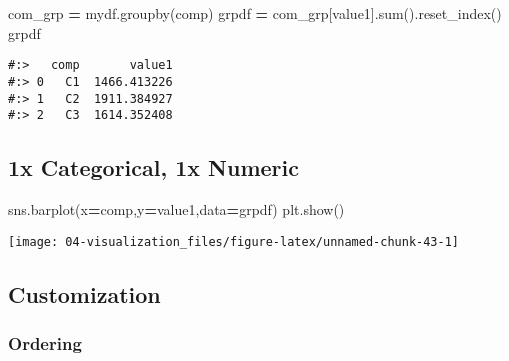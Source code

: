 \documentclass[
]{book}
\newenvironment{Shaded}{\begin{snugshade}}{\end{snugshade}}
\newcommand{\BuiltInTok}[1]{#1}
\newcommand{\NormalTok}[1]{#1}
\newcommand{\OperatorTok}[1]{\textcolor[rgb]{0.43,0.43,0.43}{\textbf{#1}}}
\newcommand{\StringTok}[1]{\textcolor[rgb]{0.5,0.5,0.5}{#1}}
\begin{document}
\begin{Shaded}
\begin{Highlighting}[]
\NormalTok{com\_grp }\OperatorTok{=}\NormalTok{ mydf.groupby(}\StringTok{\textquotesingle{}comp\textquotesingle{}}\NormalTok{)}
\NormalTok{grpdf }\OperatorTok{=}\NormalTok{ com\_grp[}\StringTok{\textquotesingle{}value1\textquotesingle{}}\NormalTok{].}\BuiltInTok{sum}\NormalTok{().reset\_index()}
\NormalTok{grpdf}
\end{Highlighting}
\end{Shaded}

\begin{verbatim}
#:>   comp       value1
#:> 0   C1  1466.413226
#:> 1   C2  1911.384927
#:> 2   C3  1614.352408
\end{verbatim}

\hypertarget{x-categorical-1x-numeric}{%
\subsection{1x Categorical, 1x Numeric}\label{x-categorical-1x-numeric}}

\begin{Shaded}
\begin{Highlighting}[]
\NormalTok{sns.barplot(x}\OperatorTok{=}\StringTok{\textquotesingle{}comp\textquotesingle{}}\NormalTok{,y}\OperatorTok{=}\StringTok{\textquotesingle{}value1\textquotesingle{}}\NormalTok{,data}\OperatorTok{=}\NormalTok{grpdf)}
\NormalTok{plt.show()}
\end{Highlighting}
\end{Shaded}

\texttt{[image: 04-visualization\_files/figure-latex/unnamed-chunk-43-1]}

\hypertarget{customization-1}{%
\subsection{Customization}\label{customization-1}}

\hypertarget{ordering}{%
\subsubsection{Ordering}\label{ordering}}
\end{document}
